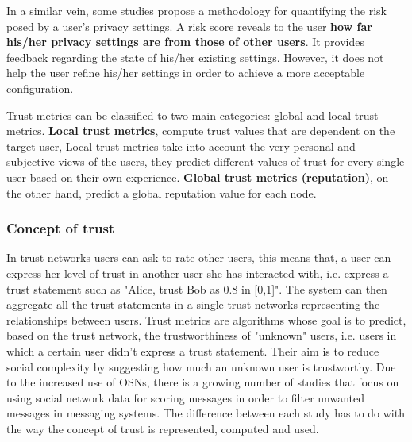 In a similar vein,
	some studies \cite{maximilien_privacyasaservice_2009} propose a methodology for quantifying the risk posed by a user’s privacy settings.
A risk score reveals to the user \textbf{how far his/her privacy settings are from those of other users}.
It provides feedback regarding the state of his/her existing settings.
However,
	it does not help the user refine his/her settings in order to achieve a more acceptable configuration.

Trust metrics can be classified to two main categories: global and local trust metrics.
\textbf{Local trust metrics},
	compute trust values that are dependent on the target user,
	Local trust metrics take into account the very personal and subjective views of the users,
	they predict different values of trust for every single user based on their own experience.
\textbf{Global trust metrics (reputation)},
	on the other hand,
	predict a global reputation value for each node.

\subsubsection{Concept of trust}

In trust networks users can ask to rate other users,
	this means that,
	a user can express her level of trust in another user she has interacted with,
	i.e. express a trust statement such as "Alice, trust Bob as 0.8 in [0,1]".
The system can then aggregate all the trust statements in a single trust networks representing the relationships between users.
Trust metrics are algorithms whose goal is to predict,
	based on the trust network,
	the trustworthiness of "unknown" users,
	i.e. users in which a certain user didn’t express a trust statement.
Their aim is to reduce social complexity by suggesting how much an unknown user is trustworthy.
Due to the increased use of OSNs,
	there is a growing number of studies that focus on using social network data for scoring messages in order to filter unwanted messages in messaging systems.
The difference between each study has to do with the way the concept of trust is represented,
	computed and used.

